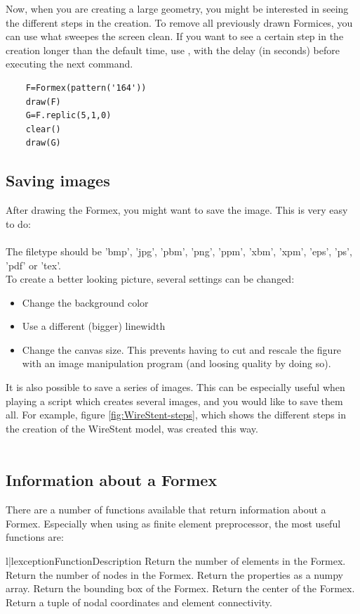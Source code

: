 Now, when you are creating a large geometry, you might be interested in seeing the different steps in the creation. To remove all previously drawn Formices, you can use   what sweepes the screen clean. If you want to see a certain step in the creation longer than the default time, use , with  the delay (in seconds) before executing the next command.
\begin{verbatim}
	F=Formex(pattern('164'))
	draw(F)
	G=F.replic(5,1,0)
	clear()
	draw(G)
\end{verbatim}


\subsection{Saving images}
\label{subsec:images}
After drawing the Formex, you might want to save the image. This is very easy to do:\\
\\
The filetype should be 'bmp', 'jpg', 'pbm', 'png', 'ppm', 'xbm', 'xpm', 'eps', 'ps', 'pdf' or 'tex'. \\
To create a better looking picture, several settings can be changed:
\begin{itemize}
	\item Change the background color 
	\item Use a different (bigger) linewidth 
	\item Change the canvas size. This prevents having to cut and rescale the figure with an image manipulation program (and loosing quality by doing so).  
\end{itemize}

It is also possible to save a series of images. This can be especially useful when playing a script which creates several images, and you would like to save them all.  For example, figure \ref{fig:WireStent-steps}, which shows the different steps in the creation of the WireStent model, was created this way.\\
\\


\subsection{Information about a Formex}
\label{subsec:info}
There are a number of functions available that return information about a Formex. Especially when using \pyformex as finite element preprocessor, the most useful functions are:
\begin{tableii}{l|l}{exception}{Function}{Description}
		{Return the number of elements in the Formex.}
		{Return the number of nodes in the Formex.}
		{Return the properties as a numpy array.}
		{Return the bounding box of the Formex.}
		{Return the center of the Formex.}
		{Return a tuple of nodal coordinates and element connectivity.}
\end{tableii}

